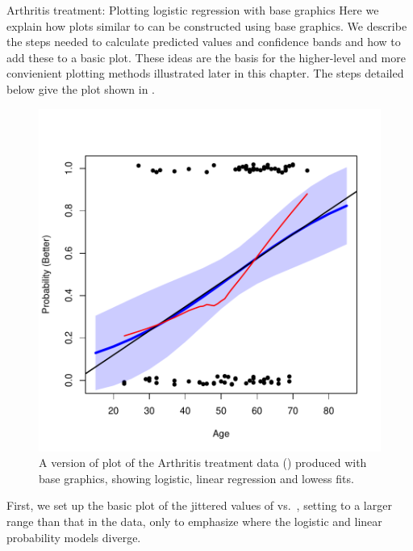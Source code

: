 \documentclass[11pt]{book}
\renewenvironment{knitrout}{\small\renewcommand{\baselinestretch}{.85}}{} %
\begin{document}
\begin{Example}[arthrit7]{Arthritis treatment: Plotting logistic regression with base graphics}
Here we explain 
how plots similar to  can be constructed
using \R base graphics. We describe the steps needed to calculate predicted values and confidence
bands and how to add these to a basic plot.  These ideas are the basis for the higher-level
and more convienient plotting methods illustrated later in this chapter.
The steps detailed below give the plot shown in .

\begin{knitrout}
\color{fgcolor}\begin{figure}[!htbp]


\centerline{\includegraphics[width=.6\textwidth]{ch07/fig/arthritis-age2} }

\caption[A version of plot of the Arthritis treatment data produced with R base graphics]{A version of plot of the Arthritis treatment data () produced with \R base graphics, showing logistic, linear regression and lowess fits.\label{fig:arthritis-age2}}
\end{figure}


\end{knitrout}
First, we set up the basic plot of the jittered values
of  vs.\ , setting  to a larger range than
that in the data, only to emphasize where the logistic and linear probability models diverge.


\end{Example}
\end{document}
